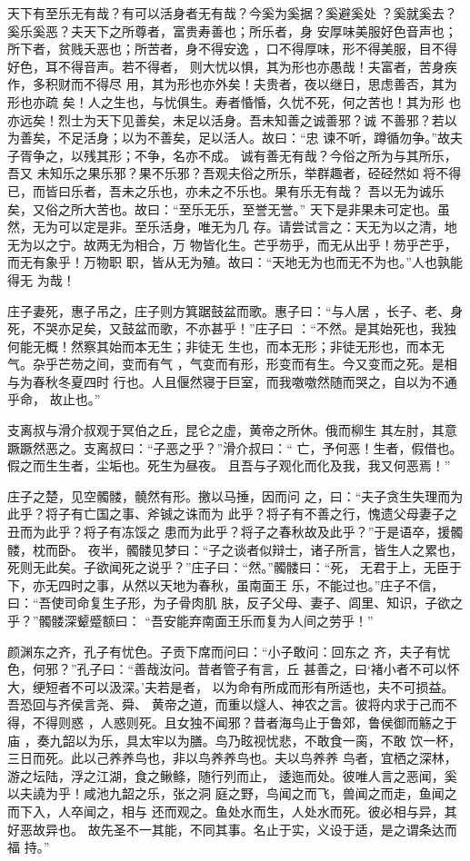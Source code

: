 \documentclass[12pt,UTF8]{ctexbook}
\begin{document}
天下有至乐无有哉？有可以活身者无有哉？今奚为奚据？奚避奚处 ？奚就奚去？奚乐奚恶？夫天下之所尊者，富贵寿善也；所乐者，身 安厚味美服好色音声也；所下者，贫贱夭恶也；所苦者，身不得安逸 ，口不得厚味，形不得美服，目不得好色，耳不得音声。若不得者， 则大忧以惧，其为形也亦愚哉！夫富者，苦身疾作，多积财而不得尽 用，其为形也亦外矣！夫贵者，夜以继日，思虑善否，其为形也亦疏 矣！人之生也，与忧俱生。寿者惛惛，久忧不死，何之苦也！其为形 也亦远矣！烈士为天下见善矣，未足以活身。吾未知善之诚善邪？诚 不善邪？若以为善矣，不足活身；以为不善矣，足以活人。故曰：“忠 谏不听，蹲循勿争。”故夫子胥争之，以残其形；不争，名亦不成。 诚有善无有哉？今俗之所为与其所乐，吾又 未知乐之果乐邪？果不乐邪？吾观夫俗之所乐，举群趣者，硁硁然如 将不得已，而皆曰乐者，吾未之乐也，亦未之不乐也。果有乐无有哉？ 吾以无为诚乐矣，又俗之所大苦也。故曰：“至乐无乐，至誉无誉。” 天下是非果未可定也。虽然，无为可以定是非。至乐活身，唯无为几 存。请尝试言之：天无为以之清，地无为以之宁。故两无为相合，万 物皆化生。芒乎芴乎，而无从出乎！芴乎芒乎，而无有象乎！万物职 职，皆从无为殖。故曰：“天地无为也而无不为也。”人也孰能得无 为哉！

庄子妻死，惠子吊之，庄子则方箕踞鼓盆而歌。惠子曰：“与人居 ，长子、老、身死，不哭亦足矣，又鼓盆而歌，不亦甚乎！”庄子曰 ：“不然。是其始死也，我独何能无概！然察其始而本无生；非徒无 生也，而本无形；非徒无形也，而本无气。杂乎芒芴之间，变而有气 ，气变而有形，形变而有生。今又变而之死。是相与为春秋冬夏四时 行也。人且偃然寝于巨室，而我噭噭然随而哭之，自以为不通乎命， 故止也。”

支离叔与滑介叔观于冥伯之丘，昆仑之虚，黄帝之所休。俄而柳生 其左肘，其意蹶蹶然恶之。支离叔曰：“子恶之乎？”滑介叔曰：“ 亡，予何恶！生者，假借也。假之而生生者，尘垢也。死生为昼夜。 且吾与子观化而化及我，我又何恶焉！”

庄子之楚，见空髑髅，髐然有形。撽以马捶，因而问 之，曰：“夫子贪生失理而为此乎？将子有亡国之事、斧铖之诛而为 此乎？将子有不善之行，愧遗父母妻子之丑而为此乎？将子有冻馁之 患而为此乎？将子之春秋故及此乎？”于是语卒，援髑髅，枕而卧。 夜半，髑髅见梦曰：“子之谈者似辩士，诸子所言，皆生人之累也， 死则无此矣。子欲闻死之说乎？”庄子曰：“然。”髑髅曰：“死， 无君于上，无臣于下，亦无四时之事，从然以天地为春秋，虽南面王 乐，不能过也。”庄子不信，曰：“吾使司命复生子形，为子骨肉肌 肤，反子父母、妻子、闾里、知识，子欲之乎？”髑髅深颦蹙额曰： “吾安能弃南面王乐而复为人间之劳乎！”

颜渊东之齐，孔子有忧色。子贡下席而问曰：“小子敢问：回东之 齐，夫子有忧色，何邪？”孔子曰：“善哉汝问。昔者管子有言，丘 甚善之，曰‘褚小者不可以怀大，绠短者不可以汲深。’夫若是者， 以为命有所成而形有所适也，夫不可损益。吾恐回与齐侯言尧、舜、 黄帝之道，而重以燧人、神农之言。彼将内求于己而不得，不得则惑 ，人惑则死。且女独不闻邪？昔者海鸟止于鲁郊，鲁侯御而觞之于庙 ，奏九韶以为乐，具太牢以为膳。鸟乃眩视忧悲，不敢食一脔，不敢 饮一杯，三日而死。此以己养养鸟也，非以鸟养养鸟也。夫以鸟养养 鸟者，宜栖之深林，游之坛陆，浮之江湖，食之鳅鲦，随行列而止， 逶迤而处。彼唯人言之恶闻，奚以夫譊为乎！咸池九韶之乐，张之洞 庭之野，鸟闻之而飞，兽闻之而走，鱼闻之而下入，人卒闻之，相与 还而观之。鱼处水而生，人处水而死。彼必相与异，其好恶故异也。 故先圣不一其能，不同其事。名止于实，义设于适，是之谓条达而福 持。”
\end{document}
